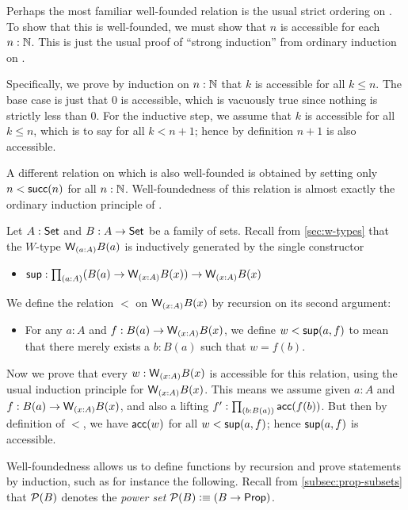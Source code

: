\begin{eg}\label{thm:nat-wf}
  Perhaps the most familiar well-founded relation is the usual strict ordering on \nat.
  To show that this is well-founded, we must show that $n$ is accessible for each $n:\mathbb{N}$.
  This is just the usual proof of ``strong induction'' from ordinary induction on \nat.

  Specifically, we prove by induction on $n:\mathbb{N}$ that $k$ is accessible for all $k\le n$.
  The base case is just that $0$ is accessible, which is vacuously true since nothing is strictly less than $0$.
  For the inductive step, we assume that $k$ is accessible for all $k\le n$, which is to say for all $k<n+1$; hence by definition $n+1$ is also accessible.

  A different relation on \nat which is also well-founded is obtained by setting only $n < \mathsf{succ}(n)$ for all $n:\mathbb{N}$.
  Well-foundedness of this relation is almost exactly the ordinary induction principle of \nat.
\end{eg}

\begin{eg}\label{thm:wtype-wf}
  Let $A:\mathsf{Set}$ and $B : A \to \mathsf{Set}$ be a family of sets.
  Recall from \autoref{sec:w-types} that the $W$-type $\wtype{a:A} B(a)$ is inductively generated by the single constructor
  \begin{itemize}
  \item $\supp : \prd{a:A} (B(a) \to \wtype{x:A} B(x)) \to \wtype{x:A} B(x)$
  \end{itemize}
  We define the relation $<$ on $\wtype{x:A} B(x)$ by recursion on its second argument:
  \begin{itemize}
  \item For any $a:A$ and $f:B(a) \to \wtype{x:A} B(x)$, we define $w<{\mathsf{sup}}(a,f)$ to mean that there merely exists a $b:B(a)$ such that $w = f(b)$.
  \end{itemize}
  Now we prove that every $w:\wtype{x:A} B(x)$ is accessible for this relation, using the usual induction principle for $\wtype{x:A}B(x)$.
  This means we assume given $a:A$ and $f:B(a) \to \wtype{x:A} B(x)$, and also a lifting $f' : \prd{b:B(a)} \acc(f(b))$.
  But then by definition of $<$, we have $\mathsf{acc}(w)$ for all $w<{\mathsf{sup}}(a,f)$; hence ${\mathsf{sup}}(a,f)$ is accessible.
\end{eg}

Well-foundedness allows us to define functions by recursion and prove statements by induction, such as for instance the following.
Recall from \autoref{subsec:prop-subsets} that $\mathcal{P}(B)$ denotes the \emph{power set} $\mathcal{P}(B) \vcentcolon\equiv (B\to\mathsf{Prop})$.

